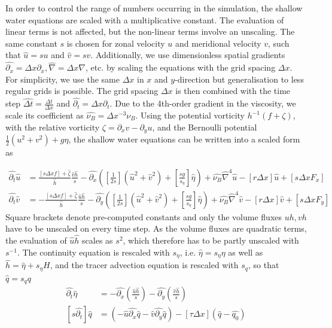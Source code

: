 In order to control the range of numbers occurring in the simulation, the shallow water equations are scaled with a multiplicative
constant. The evaluation of linear terms is not affected, but the non-linear terms involve an unscaling. The same constant $s$
is chosen for zonal velocity $u$  and meridional velocity $v$, such that $\hat{u} = su$ and $\hat{v} = sv$.
Additionally, we use dimensionless spatial gradients $\hat{\partial_x} = \Delta x \partial_x, \hat{\nabla} = \Delta x \nabla$, etc.
by scaling the equations with the grid spacing $\Delta x$. For simplicity, we use the same $\Delta x$ in $x$ and $y$-direction
but generalisation to less regular grids is possible. The grid spacing $\Delta x$ is then combined with the time step
$\widehat{\Delta t} = \tfrac{\Delta t}{\Delta x}$ and $\hat{\partial_t} = \Delta x \partial_t$. Due to the 4th-order gradient in the
viscosity, we scale its coefficient as $\hat{\nu_B} = \Delta x^{-3}\nu_B$. Using the potential vorticity $h^{-1}(f + \zeta)$,
with the relative vorticity $\zeta = \partial_xv - \partial_yu$, and the Bernoulli potential $\tfrac{1}{2}(u^2 + v^2) + g\eta$,
the shallow water equations can be written into a scaled form as

\begin{align}
\hat{\partial_t}\hat{u} &= \frac{[s\Delta x f]+ \hat{\zeta}}{\hat{h}}\frac{\hat{v}\hat{h}}{s} -\hat{\partial_x}
\left([\frac{1}{2s}](\hat{u}^2 + \hat{v}^2) + [\frac{sg}{s_\eta}]\hat{\eta} \right) + \hat{\nu_B} \hat{\nabla}^4 \hat{u}
- [r\Delta x]\hat{u} + [s\Delta x F_x] \nonumber \\
\hat{\partial_t}\hat{v} &= - \frac{[s\Delta x f]+ \hat{\zeta}}{\hat{h}}\frac{\hat{u}\hat{h}}{s} -\hat{\partial_y}
\left([\frac{1}{2s}](\hat{u}^2 + \hat{v}^2) + [\frac{sg}{s_\eta}]\hat{\eta} \right) + \hat{\nu_B} \hat{\nabla}^4 \hat{v}
- [r\Delta x]\hat{v} + [s\Delta x F_y]
\end{align}
Square brackets denote pre-computed constants and only the volume fluxes $uh,vh$ have to be unscaled on every time step.
As the volume fluxes are quadratic terms, the evaluation of $\hat{u}\hat{h}$ scales as $s^2$, which therefore has to be
partly unscaled with $s^{-1}$. The continuity equation is rescaled with $s_\eta$, i.e. $\hat{\eta} = s_\eta \eta$ as well as
$\hat{h} = \hat{\eta} + s_\eta H$, and the tracer advection equation is rescaled with $s_q$, so that $\hat{q} = s_q q$
\begin{align}
\hat{\partial_t} \hat{\eta} &= -\hat{\partial_x}(\frac{\hat{u}\hat{h}}{s}) - \hat{\partial_y}(\frac{\hat{v}\hat{h}}{s}) \nonumber \\
[s\hat{\partial_t}] \hat{q} &= \left(-\hat{u}\hat{\partial_x} \hat{q} - \hat{v}\hat{\partial_y} \hat{q}\right) - [\tau \Delta x](\hat{q} - \hat{q_0})
\end{align}

